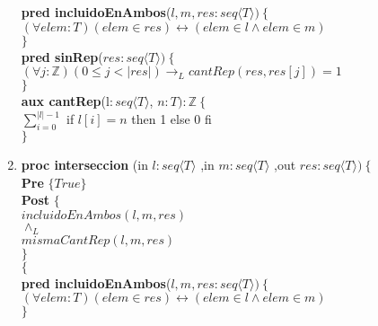 \documentclass[a4paper]{article}
\begin{document}
\begin{enumerate}[label=\alph*)]
			\textbf{pred incluidoEnAmbos}($l,m,res:seq\langle T\rangle)
			\ \{$\smallskip \\
			\hspace*{6mm}$ (\forall elem:T)(elem\in res) \leftrightarrow (elem\in l \wedge 
			elem\in m)$\\
			$\}$\smallskip \\	
			
			\textbf{pred sinRep}($res:seq\langle T\rangle)
			\ \{$\smallskip \\
			\hspace*{6mm}$(\forall j:\mathbb{Z})(0\leq j<|res|)\rightarrow_L
			cantRep(res,res[j])=1$\\
			$\}$\smallskip \\	
						
			
			\textbf{aux cantRep}(l$: seq\langle T\rangle$, $n:T):\mathbb{Z}
			\ \{$\smallskip \\
			\hspace*{6mm}$\sum_{i=0}^{|l|-1}$ if $l[i]=n$ then 1 else 0 fi\\
			$\}$\smallskip \\	
			
		\item
			
			\textbf{proc interseccion }(in $l:seq\langle T\rangle$
				,in $m:seq\langle T\rangle$
				,out $res:seq\langle T\rangle )\ \{$\smallskip \\
			\hspace*{6mm} \textbf{Pre }$\{ True\}$\smallskip \\
			\hspace*{6mm} \textbf{Post }$\{$\\
			\hspace*{6mm} $incluidoEnAmbos(l,m,res)$\\
			\hspace*{6mm} $\wedge_L$\\
			\hspace*{6mm} $mismaCantRep(l,m,res)$\\
			\hspace*{6mm} $\}$\\
			$\{$\smallskip \\
			
			\textbf{pred incluidoEnAmbos}($l,m,res:seq\langle T\rangle)
			\ \{$\smallskip \\
			\hspace*{6mm}$ (\forall elem:T)(elem\in res) \leftrightarrow (elem\in l \wedge 
			elem\in m)$\\
			$\}$\smallskip \\	
			

\end{enumerate}
\end{document}
